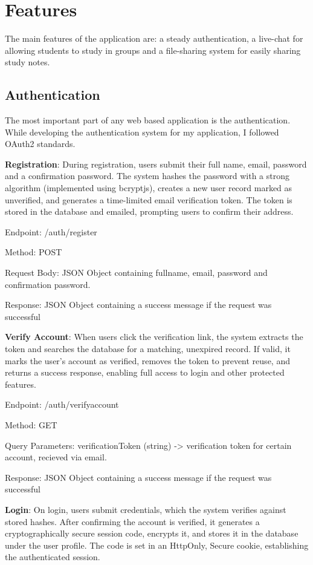 \newpage
\section{Features}
The main features of the application are: a steady authentication, a live-chat for allowing students to study in groups and a file-sharing system for easily sharing study notes.

\subsection{Authentication}
The most important part of any web based application is the authentication. While developing the authentication system for my application, I followed OAuth2 standards. 

\textbf{Registration}: During registration, users submit their full name, email, password and a confirmation password. The system hashes the password with a strong algorithm (implemented using bcryptjs), creates a new user record marked as unverified, and generates a time-limited email verification token. The token is stored in the database and emailed, prompting users to confirm their address.

Endpoint: /auth/register

Method: POST

Request Body: JSON Object containing fullname, email, password and confirmation password.

Response: JSON Object containing a success message if the request was successful

\textbf{Verify Account}: When users click the verification link, the system extracts the token and searches the database for a matching, unexpired record. If valid, it marks the user’s account as verified, removes the token to prevent reuse, and returns a success response, enabling full access to login and other protected features.

Endpoint: /auth/verifyaccount

Method: GET

Query Parameters: verificationToken (string) -> verification token for certain account, recieved via email.

Response: JSON Object containing a success message if the request was successful


\textbf{Login}: On login, users submit credentials, which the system verifies against stored hashes. After confirming the account is verified, it generates a cryptographically secure session code, encrypts it, and stores it in the database under the user profile. The code is set in an HttpOnly, Secure cookie, establishing the authenticated session.

